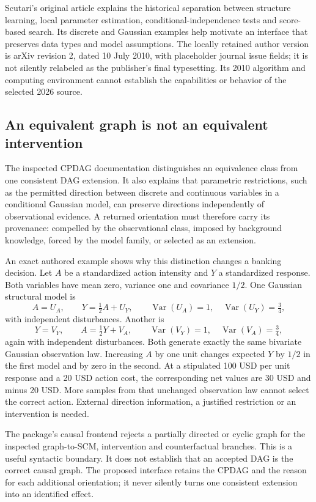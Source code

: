 Scutari's original article explains the historical separation between structure learning, local parameter estimation, conditional-independence tests and score-based search. Its discrete and Gaussian examples help motivate an interface that preserves data types and model assumptions. The locally retained author version is arXiv revision 2, dated 10 July 2010, with placeholder journal issue fields; it is not silently relabeled as the publisher's final typesetting. Its 2010 algorithm and computing environment cannot establish the capabilities or behavior of the selected 2026 source.~\citep{exec24_bnlearn_original}

\subsection{An equivalent graph is not an equivalent intervention}
The inspected CPDAG documentation distinguishes an equivalence class from one consistent DAG extension. It also explains that parametric restrictions, such as the permitted direction between discrete and continuous variables in a conditional Gaussian model, can preserve directions independently of observational evidence. A returned orientation must therefore carry its provenance: compelled by the observational class, imposed by background knowledge, forced by the model family, or selected as an extension.~\citep{exec24_bnlearn_sources}

An exact authored example shows why this distinction changes a banking decision. Let $A$ be a standardized action intensity and $Y$ a standardized response. Both variables have mean zero, variance one and covariance $1/2$. One Gaussian structural model is
\[
 A=U_A,\qquad Y=\tfrac12 A+U_Y,
 \qquad \operatorname{Var}(U_A)=1,\quad \operatorname{Var}(U_Y)=\tfrac34,
\]
with independent disturbances. Another is
\[
 Y=V_Y,\qquad A=\tfrac12 Y+V_A,
 \qquad \operatorname{Var}(V_Y)=1,\quad \operatorname{Var}(V_A)=\tfrac34,
\]
again with independent disturbances. Both generate exactly the same bivariate Gaussian observation law. Increasing $A$ by one unit changes expected $Y$ by $1/2$ in the first model and by zero in the second. At a stipulated 100 USD per unit response and a 20 USD action cost, the corresponding net values are 30 USD and minus 20 USD. More samples from that unchanged observation law cannot select the correct action. External direction information, a justified restriction or an intervention is needed.~\citep{exec24_bnlearn_contract}

The package's causal frontend rejects a partially directed or cyclic graph for the inspected graph-to-SCM, intervention and counterfactual branches. This is a useful syntactic boundary. It does not establish that an accepted DAG is the correct causal graph. The proposed interface retains the CPDAG and the reason for each additional orientation; it never silently turns one consistent extension into an identified effect.~\citep{exec24_bnlearn_sources,exec24_bnlearn_contract}

